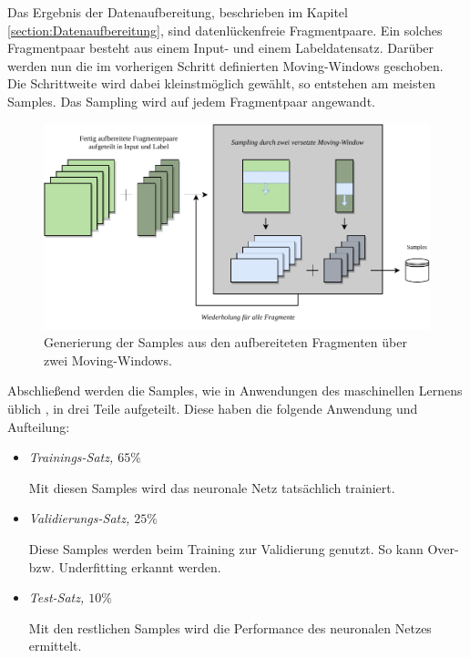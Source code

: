 \documentclass[
12pt, %
toc=listofnumbered, %
toc=chapterentrydotfill, %
numbers=noenddot, %
captions=tableheading, %
bibliography=numbered
]{scrreprt}
\newcommand{\qm}[1]{\glqq#1\grqq{}} %
\begin{document}
Das Ergebnis der Datenaufbereitung, beschrieben im Kapitel \ref{section:Datenaufbereitung}, sind datenlückenfreie Fragmentpaare. Ein solches Fragmentpaar besteht aus einem Input- und einem Labeldatensatz. Darüber werden nun die im vorherigen Schritt definierten Moving-Windows \qm{geschoben}. Die Schrittweite wird dabei kleinstmöglich gewählt, so entstehen am meisten Samples. Das Sampling wird auf jedem Fragmentpaar angewandt.

\begin{figure}[tph]
	\begin{center}
		\includegraphics[]{./images/sampling.pdf}
		\caption{Generierung der Samples aus den aufbereiteten Fragmenten über zwei Moving-Windows.}
		\label{fig:sampling}
	\end{center}
\end{figure}

Abschließend werden die Samples, wie in Anwendungen des maschinellen Lernens üblich \cite{2020_Shah_TrainValidationTest}, in drei Teile aufgeteilt. Diese haben die folgende Anwendung und Aufteilung:

\begin{itemize}
	\item \textit{Trainings-Satz, $65\%$}
	
	Mit diesen Samples wird das neuronale Netz tatsächlich trainiert. 

	\item \textit{Validierungs-Satz, $25\%$}
	
	Diese Samples werden beim Training zur Validierung genutzt. So kann Over- bzw. Underfitting erkannt werden.

	\item \textit{Test-Satz, $10\%$}
	
	Mit den restlichen Samples wird die Performance des neuronalen Netzes ermittelt. 

\end{itemize}
\end{document}
